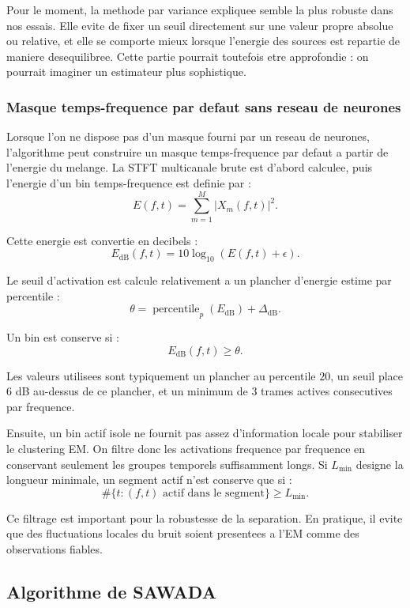 \documentclass[11pt,a4paper]{article}
\begin{document}
Pour le moment, la methode par variance expliquee semble la plus robuste dans
nos essais. Elle evite de fixer un seuil directement sur une valeur propre
absolue ou relative, et elle se comporte mieux lorsque l'energie des sources est
repartie de maniere desequilibree. Cette partie pourrait toutefois etre
approfondie : on pourrait imaginer un estimateur plus sophistique.
\subsubsection{Masque temps-frequence par defaut sans reseau de neurones} \label{subsubsec:energieBin}

Lorsque l'on ne dispose pas d'un masque fourni par un reseau de neurones,
l'algorithme peut construire un masque temps-frequence par defaut a partir de
l'energie du melange. La STFT multicanale brute est d'abord calculee, puis
l'energie d'un bin temps-frequence est definie par :
\[
  E(f,t) = \sum_{m=1}^{M} |X_m(f,t)|^2.
\]

Cette energie est convertie en decibels :
\[
  E_{\mathrm{dB}}(f,t)
    =
    10 \log_{10}\left(E(f,t)+\epsilon\right).
\]

Le seuil d'activation est calcule relativement a un plancher d'energie estime
par percentile :
\[
  \theta
    =
    \operatorname{percentile}_{p}\left(E_{\mathrm{dB}}\right)
    +
    \Delta_{\mathrm{dB}}.
\]

Un bin est conserve si :
\[
  E_{\mathrm{dB}}(f,t) \geq \theta.
\]

Les valeurs utilisees sont typiquement un
plancher au percentile $20$, un seuil place $6$ dB au-dessus de ce plancher, et
un minimum de $3$ trames actives consecutives par frequence.

Ensuite, un bin actif isole ne fournit pas assez d'information locale pour
stabiliser le clustering EM. On filtre donc les activations
frequence par frequence en conservant seulement les groupes temporels
suffisamment longs. Si $L_{\min}$ designe la longueur minimale, un segment actif
n'est conserve que si :
\[
  \#\{t : (f,t) \text{ actif dans le segment}\} \geq L_{\min}.
\]

Ce filtrage est important pour la robustesse de la separation. En pratique, il
evite que des fluctuations locales du bruit soient presentees a l'EM comme des
observations fiables.


\subsection{Algorithme de SAWADA}
\end{document}
